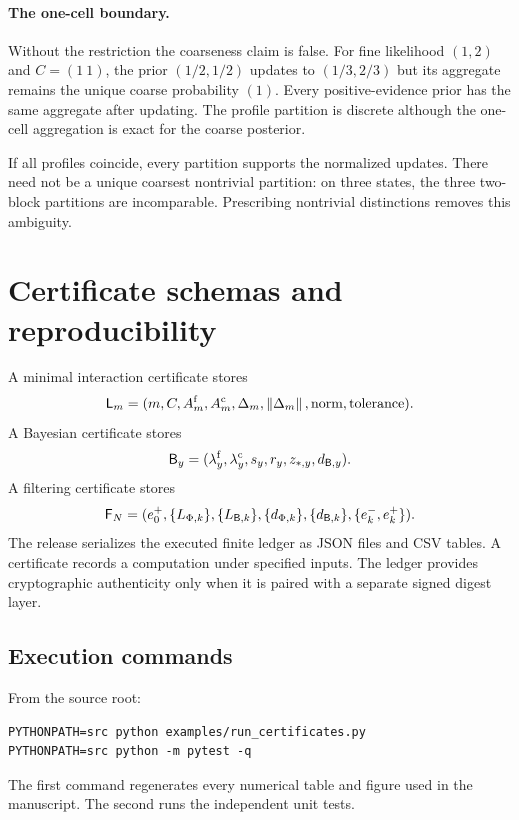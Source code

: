\documentclass[11pt,oneside,openany]{book}
\numberwithin{equation}{section}
\begin{document}
\paragraph{The one-cell boundary.}
Without the restriction the coarseness claim is false. For fine likelihood $(1,2)$ and $C=(1\ 1)$, the prior $(1/2,1/2)$ updates to $(1/3,2/3)$ but its aggregate remains the unique coarse probability $(1)$. Every positive-evidence prior has the same aggregate after updating. The profile partition is discrete although the one-cell aggregation is exact for the coarse posterior.

If all profiles coincide, every partition supports the normalized updates. There need not be a unique coarsest nontrivial partition: on three states, the three two-block partitions are incomparable. Prescribing nontrivial distinctions removes this ambiguity.

\section{Certificate schemas and reproducibility}\label{PRIQ:app:schemas}
A minimal interaction certificate stores
\begin{equation}\label{PRIQ:eq:lumpability-certificate-schema}
  \mathsf L_m
  =
  (m,C,A_m^{\mathrm f},A_m^{\mathrm c},\Delta_m,
  \left\lVert \Delta_m\right\rVert,\text{norm},\text{tolerance}).
\end{equation}
A Bayesian certificate stores
\begin{equation}\label{PRIQ:eq:bayes-certificate-schema}
  \mathsf B_y
  =
  (\lambda_y^{\mathrm f},\lambda_y^{\mathrm c},s_y,r_y,
  z_{*,y},d_{\mathsf B,y}).
\end{equation}
A filtering certificate stores
\begin{equation}\label{PRIQ:eq:filter-certificate-schema}
  \mathsf F_N
  =
  (e_0^+,\{L_{\Phi,k}\},\{L_{\mathsf B,k}\},
  \{d_{\Phi,k}\},\{d_{\mathsf B,k}\},
  \{e_k^-,e_k^+\}).
\end{equation}
The release serializes the executed finite ledger as JSON files and CSV tables.  A certificate records a computation under specified inputs.  The ledger provides cryptographic authenticity only when it is paired with a separate signed digest layer.

\subsection{Execution commands}
From the source root:
\begin{lstlisting}[style=code]
PYTHONPATH=src python examples/run_certificates.py
PYTHONPATH=src python -m pytest -q
\end{lstlisting}
The first command regenerates every numerical table and figure used in the manuscript.  The second runs the independent unit tests.
\end{document}
